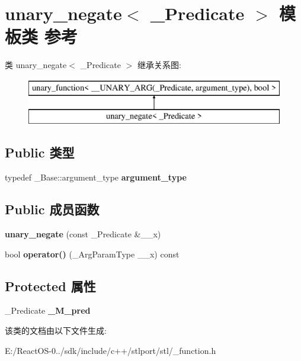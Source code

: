 \hypertarget{classunary__negate}{}\section{unary\+\_\+negate$<$ \+\_\+\+Predicate $>$ 模板类 参考}
\label{classunary__negate}
类 unary\+\_\+negate$<$ \+\_\+\+Predicate $>$ 继承关系图\+:\begin{figure}[H]
\begin{center}
\leavevmode
\includegraphics[height=2.000000cm]{classunary__negate}
\end{center}
\end{figure}
\subsection*{Public 类型}
\begin{DoxyCompactItemize}
\item 
\mbox{\label{classunary__negate_ada191f4e8df5cb838d1f8516d21d16bc}} 
typedef \+\_\+\+Base\+::argument\+\_\+type {\bfseries argument\+\_\+type}
\end{DoxyCompactItemize}
\subsection*{Public 成员函数}
\begin{DoxyCompactItemize}
\item 
\mbox{\label{classunary__negate_a9a4d2e2a7911a2c456a9825d91e59cc9}} 
{\bfseries unary\+\_\+negate} (const \+\_\+\+Predicate \&\+\_\+\+\_\+x)
\item 
\mbox{\label{classunary__negate_ad0ed3524f55aed06c6ac86fa3c16f655}} 
bool {\bfseries operator()} (\+\_\+\+Arg\+Param\+Type \+\_\+\+\_\+x) const
\end{DoxyCompactItemize}
\subsection*{Protected 属性}
\begin{DoxyCompactItemize}
\item 
\mbox{\label{classunary__negate_a5c01d37bb853a32b97ac1977b3a46293}} 
\+\_\+\+Predicate {\bfseries \+\_\+\+M\+\_\+pred}
\end{DoxyCompactItemize}


该类的文档由以下文件生成\+:\begin{DoxyCompactItemize}
\item 
E\+:/\+React\+O\+S-\/0../sdk/include/c++/stlport/stl/\+\_\+function.\+h\end{DoxyCompactItemize}
